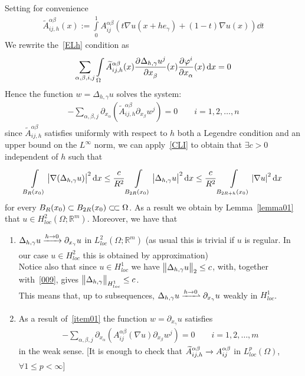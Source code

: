Setting for convenience
\begin{gather}
	\widetilde{A}_{ij,h}^{\alpha \beta }(x):=  \int\limits_{0}^{1} A_{ij}^{\alpha \beta } \left( t\nabla u(x+h e_{\gamma }) +(1-t) \nabla u(x) \right) \dd{t}
\end{gather}
We rewrite the~\eqref{ELh} condition as
\begin{gather}
	\sum\limits_{\alpha, \beta , i,j}^{} \int\limits_{\Omega}^{} \widetilde{A}_{ij,h}^{\alpha \beta }(x) \pdv[]{\Delta _{h, \gamma } u^{j}}{x_{\beta }}\/(x) \pdv[]{\varphi ^{i}}{x_{\alpha }}\/(x)   \dd{x} = 0
\end{gather}
Hence the function \( w = \Delta _{h, \gamma } u \) solves the system:
\begin{gather}
	- \sum\limits_{\alpha, \beta , j}^{} \partial_{x_{\alpha }} \left( \widetilde{A}_{ij,h}^{\alpha \beta } \partial_{x_{\beta }}w^{j} \right) = 0\qquad i=1,2,\ldots,n
\end{gather}
since \( \widetilde{A}_{ij,h}^{\alpha \beta } \) satisfies uniformly with respect to \( h \) both a Legendre condition and an upper bound on the \( L^{\infty } \) norm, we can apply~\eqref{CLI} to obtain that \( \exists c>0 \) independent of \( h \) such that
\begin{gather}
	\int\limits_{B_{R}(x_{0})}^{} \abs{\nabla (\Delta _{h, \gamma }u) }^{2} \dd{x} \leq  \frac{c}{R^{2}} \int\limits_{B_{2R}(x_{0})}^{} \abs{\Delta _{h, \gamma }u}^{2} \dd{x} \leq  \frac{c}{R^{2}} \int\limits_{B_{2R+h}(x_{0}) }^{} \abs{\nabla u}^{2} \dd{x} \label{009}
\end{gather}
for every \( B_{R}(x_{0}) \subset B_{2R}(x_{0}) \ssubset \Omega  \). As a result we obtain by Lemma~\ref{lemma01} that \( u \in H_{loc}^{2}(\Omega ; \mathbb{R}^{m})  \). Moreover, we have that
\begin{enumerate}[label= (\roman*)]
	\item\label{item01} \( \Delta _{h, \gamma } u \myxrightarrow[]{h \to 0} \partial_{x_{\gamma }}u \) in \( L_{loc}^{2}(\Omega ; \mathbb{R}^{m})  \) (as usual this is trivial if \( u \) is regular. In our case \( u \in  H_{loc}^{2} \) this is obtained by approximation) \\
	Notice also that since \( u \in H_{loc}^{1} \) we have \( \norm{\Delta _{h, \gamma }u}_{2} \leq c \), with, together with~\eqref{009}, gives \( \norm{\Delta _{h, \gamma }}_{H_{loc}^{1}}\leq c \). \\
	This means that, up to subsequences, \( \Delta _{h, \gamma }u \myxrightharpoonup[]{h \to 0} \partial_{x_{\gamma }}u \) weakly in \( H_{loc}^{1} \).
	\item As a result of~\ref{item01} the function \( w = \partial_{x_{\gamma }}u \) satisfies
	      \begin{gather}
		      - \sum\limits_{\alpha ,\beta ,j}^{} \partial_{x_{\alpha }} \left( A_{ij}^{\alpha \beta }(\nabla u) \partial_{x_{\beta }} w^{j} \right) = 0 \qquad i=1,2,\ldots,m
	      \end{gather}
	      in the weak sense. [It is enough to check that \( \widetilde{A}_{ij,h}^{\alpha \beta } \myxrightarrow[]{} A_{ij}^{\alpha \beta }\) in \( L_{loc}^{p}(\Omega ) \), \( \forall 1 \leq p < \infty \)]
\end{enumerate}
